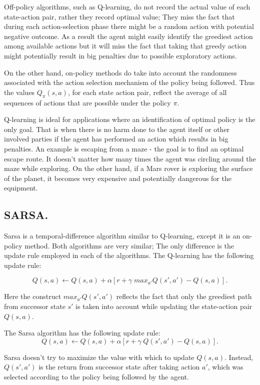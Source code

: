 Off-policy algorithms, such as Q-learning, do not record the actual value of each state-action pair, rather they record optimal value; They miss the fact that during each action-selection phase there might be a random action with potential negative outcome. As a result the agent might easily identify the greediest action among available actions but it will miss the fact that taking that greedy action might potentially result in big penalties due to possible exploratory actions.

On the other hand, on-policy methods do take into account the randomness associated with the action selection mechanism of the policy being followed. Thus the values $ Q_{\pi}(s,a) $, for each state action pair, reflect the average of all sequences of actions that are possible under the policy $ \pi $.

Q-learning is ideal for applications where an identification of optimal policy is the only goal. That is when there is no harm done to the agent itself or other involved parties if the agent has performed an action which results in big penalties. An example is escaping from a maze - the goal is to find an optimal escape route. It doesn't matter how many times the agent was circling around the maze while exploring. On the other hand, if a Mars rover is exploring the surface of the planet, it becomes very expensive and potentially dangerous for the equipment.



\subsection{SARSA.}

Sarsa is a temporal-difference algorithm similar to Q-learning, except it is an on-policy method. Both algorithms are very similar; The only difference is the update rule employed in each of the algorithms. The Q-learning has the following update rule:

$$ Q(s,a) \leftarrow Q(s,a) + \alpha [r + \gamma\; max_{a'}Q(s',a') - Q(s,a)]. $$

Here the construct $ max_{a'}Q(s',a') $ reflects the fact that only the greediest path from successor state $ s' $ is taken into account while updating the state-action pair $ Q(s,a) $.

The Sarsa algorithm has the following update rule:
$$ Q(s,a) \leftarrow Q(s,a) + \alpha [r + \gamma\; Q(s',a') - Q(s,a)]. $$

Sarsa doesn't try to maximize the value with which to update $ Q(s,a) $. Instead,  $ Q(s',a') $ is the return from successor state after taking action $ a' $, which was selected according to the policy being followed by the agent.


